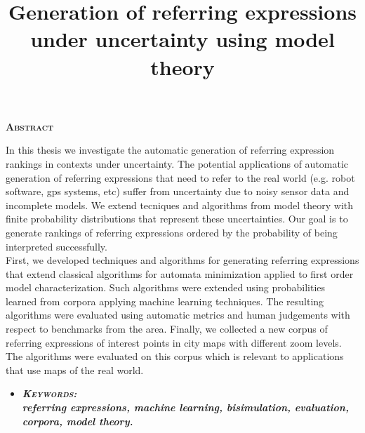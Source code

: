 \newpage

\begin{center}

{ \vspace*{1cm} }
\huge{\textbf{\textsc{\textmd{Abstract}}}}\\[1cm]

\end{center}

\title{Generation of referring expressions under uncertainty using model theory}

\normalsize{In this thesis we investigate the automatic generation of referring expression rankings in contexts under uncertainty. The potential applications of automatic generation of referring expressions that need to refer to the real world (e.g. robot software, gps systems, etc) suffer from uncertainty due to noisy sensor data and incomplete models. We extend tecniques and algorithms from model theory with finite probability distributions that represent these uncertainties. Our goal is to generate rankings of referring expressions ordered by the probability of being interpreted successfully.\\
First, we developed techniques and algorithms for generating referring expressions that extend classical algorithms for automata minimization applied to first order model characterization. Such algorithms were extended using probabilities learned from corpora applying machine learning techniques. The resulting algorithms were evaluated using automatic metrics  and human judgements with respect to benchmarks from the area. Finally, we collected a new corpus of referring expressions of interest points in city maps with different zoom levels. The algorithms were evaluated on this corpus which is relevant to applications that use maps of the real world.
}

\begin{itemize}

	\item \textbf{\emph{\textsc{Keywords:} \\ referring expressions, machine learning, bisimulation, evaluation, corpora, model theory.}}
\end{itemize}

